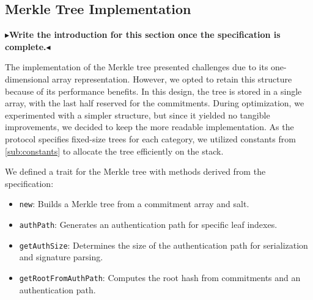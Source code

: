 \documentclass[11pt]{report}
\theoremstyle{definition}
\theoremstyle{plain}
\newcommand{\todo}[1]{{\color[rgb]{.5,0,0}\textbf{$\blacktriangleright$#1$\blacktriangleleft$}}}
\begin{document}
\subsection{Merkle Tree Implementation}\label{sub:merkle_tree_impl}
\todo{Write the introduction for this section once the specification is complete.}

The implementation of the Merkle tree presented challenges due to its one-dimensional array representation. However, we opted to retain this structure because of its performance benefits. In this design, the tree is stored in a single array, with the last half reserved for the commitments. During optimization, we experimented with a simpler structure, but since it yielded no tangible improvements, we decided to keep the more readable implementation. As the protocol specifies fixed-size trees for each category, we utilized constants from \autoref{sub:constants} to allocate the tree efficiently on the stack.

We defined a trait for the Merkle tree with methods derived from the specification:
\begin{itemize}
  \item \texttt{new}: Builds a Merkle tree from a commitment array and salt.
  \item \texttt{authPath}: Generates an authentication path for specific leaf indexes.
  \item \texttt{getAuthSize}: Determines the size of the authentication path for serialization and signature parsing.
  \item \texttt{getRootFromAuthPath}: Computes the root hash from commitments and an authentication path.
\end{itemize}
\end{document}
